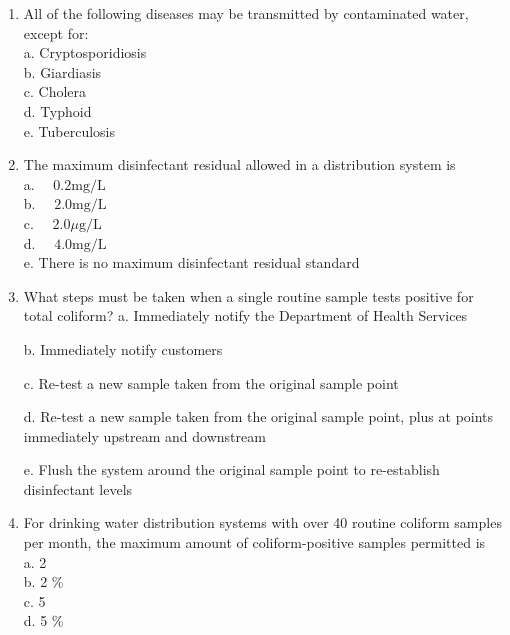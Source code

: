 \documentclass[10pt]{article}
\begin{document}
\begin{enumerate}
  \item All of the following diseases may be transmitted by contaminated water, except for:\\


a. Cryptosporidiosis\\

b. Giardiasis\\

c. Cholera\\

d. Typhoid\\

e. Tuberculosis\\


\item The maximum disinfectant residual allowed in a distribution system is\\

a. $\quad 0.2 \mathrm{mg} / \mathrm{L}$\\

b. $\quad 2.0 \mathrm{mg} / \mathrm{L}$\\

c. $\quad 2.0 \mu \mathrm{g} / \mathrm{L}$\\

d. $\quad 4.0 \mathrm{mg} / \mathrm{L}$\\

e. There is no maximum disinfectant residual standard\\

\item What steps must be taken when a single routine sample tests positive for total coliform?
a. Immediately notify the Department of Health Services

b. Immediately notify customers

c. Re-test a new sample taken from the original sample point

d. Re-test a new sample taken from the original sample point, plus at points immediately upstream and downstream

e. Flush the system around the original sample point to re-establish disinfectant levels

 \item For drinking water distribution systems with over 40 routine coliform samples per month, the maximum amount of coliform-positive samples permitted is\\
a. 2\\
b. 2 \%\\
c. 5\\
d. 5 \%


\end{enumerate}
\end{document}
